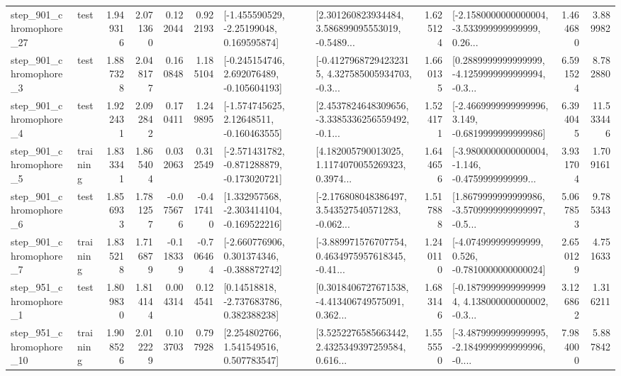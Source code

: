 \begin{tabular}{llrrrrllrlrr}
  step\_901\_chromophore\_27 &      test &      1.949316 &    2.071360 &      0.122044 &  0.922193 &    [-1.455590529, -2.25199048, 0.169595874] &  [2.301260823934484, 3.586899095553019, -0.5489... &       1.625124 &  [-2.1580000000000004, -3.533999999999999, 0.26... &            1.464680 &          3.889982 \\
   step\_901\_chromophore\_3 &      test &      1.887328 &    2.048177 &      0.160848 &  1.185104 &   [-0.245154746, 2.692076489, -0.105604193] &  [-0.41279687294232315, 4.327585005934703, -0.3... &       1.660135 &  [0.2889999999999999, -4.1259999999999994, -0.3... &            6.591524 &          8.782880 \\
   step\_901\_chromophore\_4 &      test &      1.922431 &    2.092842 &      0.170411 &  1.249895 &    [-1.574745625, 2.12648511, -0.160463555] &  [2.4537824648309656, -3.3385336256559492, -0.1... &       1.524171 &  [-2.4669999999999996, 3.149, -0.6819999999999986] &            6.394045 &         11.533446 \\
   step\_901\_chromophore\_5 &  training &      1.833341 &    1.865404 &      0.032063 &  0.312549 &  [-2.571431782, -0.871288879, -0.173020721] &  [4.182005790013025, 1.1174070055269323, 0.3974... &       1.644656 &  [-3.9800000000000004, -1.146, -0.4759999999999... &            3.931704 &          1.709161 \\
   step\_901\_chromophore\_6 &      test &      1.856933 &    1.781257 &     -0.075676 & -0.417410 &   [1.332957568, -2.303414104, -0.169522216] &  [-2.176808048386497, 3.543527540571283, -0.062... &       1.517888 &  [1.8679999999999986, -3.5709999999999997, -0.5... &            5.067853 &          9.785343 \\
   step\_901\_chromophore\_7 &  training &      1.835218 &    1.716879 &     -0.118339 & -0.706464 &   [-2.660776906, 0.301374346, -0.388872742] &  [-3.889971576707754, 0.4634975957618345, -0.41... &       1.240110 &   [-4.074999999999999, 0.526, -0.7810000000000024] &            2.650129 &          4.751633 \\
   step\_951\_chromophore\_1 &      test &      1.809830 &    1.814144 &      0.004314 &  0.124541 &     [0.14518818, -2.737683786, 0.382388238] &  [0.3018406727671538, -4.413406749575091, 0.362... &       1.683146 &  [-0.18799999999999994, 4.138000000000002, -0.3... &            3.126862 &          1.316211 \\
  step\_951\_chromophore\_10 &  training &      1.908526 &    2.012229 &      0.103703 &  0.797928 &     [2.254802766, 1.541549516, 0.507783547] &  [3.5252276585663442, 2.4325349397259584, 0.616... &       1.555550 &  [-3.4879999999999995, -2.1849999999999996, -0.... &            7.984000 &          5.887842 \\

\end{tabular}
